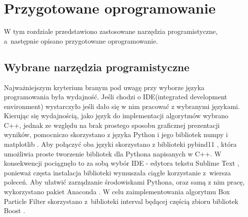 \chapter{Przygotowane oprogramowanie}
W tym rozdziale przedstawiono zastosowane narzędzia programistyczne, a~następnie opisano przygotowane oprogramowanie.
\section{Wybrane narzędzia programistyczne}
Najważniejszym kryterium branym pod uwagę przy wyborze języka programowania była wydajność. Jeśli chodzi o IDE(integrated development environment) wystarczyło jeśli dało się w nim pracować z wybranymi językami. Kierując się wydajnością, jako język do implementacji algorytmów wybrano C++, jednak ze względu na brak prostego sposobu graficznej prezentacji wyników, pomocniczo skorzystano z języka Python i jego bibliotek numpy \cite{numpy} i matplotlib \cite{matplotlib}. Aby połączyć oba języki skorzystano z biblioteki pybind11 \cite{pybind11}, która umożliwia proste tworzenie bibliotek dla Pythona napisanych w C++. W konsekwencji pociągnęło to za sobą wybór IDE - edytora tekstu Sublime Text \cite{sublime}, ponieważ częsta instalacja biblioteki wymuszała ciągłe korzystanie z~wiersza poleceń. Aby ułatwić zarządzanie środowiskami Pythona, oraz samą z nim pracę, wykorzystano pakiet Anaconda \cite{anaconda}. W celu zaimplementowania algorytmu Box Particle Filter skorzystano z~biblioteki interval będącej częścią zbioru bibliotek Boost \cite{boost_int}.
